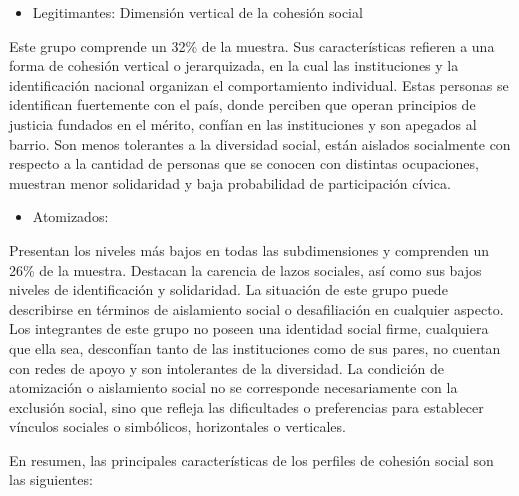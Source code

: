 \documentclass[
  12pt,
]{book}
\providecommand{\tightlist}{%
  \setlength{\itemsep}{0pt}\setlength{\parskip}{0pt}}
\begin{document}
\begin{itemize}
\tightlist
\item
  Legitimantes: Dimensión vertical de la cohesión social
\end{itemize}

Este grupo comprende un 32\% de la muestra. Sus características refieren a una forma de cohesión vertical o jerarquizada, en la cual las instituciones y la identificación nacional organizan el comportamiento individual. Estas personas se identifican fuertemente con el país, donde perciben que operan principios de justicia fundados en el mérito, confían en las instituciones y son apegados al barrio. Son menos tolerantes a la diversidad social, están aislados socialmente con respecto a la cantidad de personas que se conocen con distintas ocupaciones, muestran menor solidaridad y baja probabilidad de participación cívica.

\begin{itemize}
\tightlist
\item
  Atomizados:
\end{itemize}

Presentan los niveles más bajos en todas las subdimensiones y comprenden un 26\% de la muestra. Destacan la carencia de lazos sociales, así como sus bajos niveles de identificación y solidaridad. La situación de este grupo puede describirse en términos de aislamiento social o desafiliación en cualquier aspecto. Los integrantes de este grupo no poseen una identidad social firme, cualquiera que ella sea, desconfían tanto de las instituciones como de sus pares, no cuentan con redes de apoyo y son intolerantes de la diversidad. La condición de atomización o aislamiento social no se corresponde necesariamente con la exclusión social, sino que refleja las dificultades o preferencias para establecer vínculos sociales o simbólicos, horizontales o verticales.

En resumen, las principales características de los perfiles de cohesión social son las siguientes:
\end{document}

